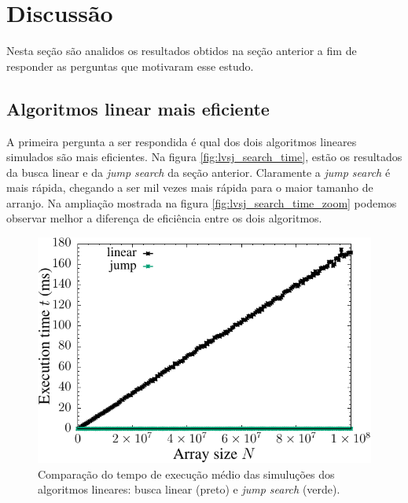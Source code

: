 \chapter{Discussão}

Nesta seção são analidos os resultados obtidos na seção anterior a fim de responder as perguntas que motivaram esse estudo.

\section{Algoritmos linear mais eficiente}

A primeira pergunta a ser respondida é qual dos dois algoritmos lineares simulados são mais eficientes. Na figura \ref{fig:lvsj_search_time}, estão os resultados da busca linear e da {\it jump search} da seção anterior. Claramente a {\it jump search} é mais rápida, chegando a ser mil vezes mais rápida para o maior tamanho de arranjo. Na ampliação mostrada na figura \ref{fig:lvsj_search_time_zoom} podemos observar melhor a diferença de eficiência entre os dois algoritmos. 

\begin{figure}[H]
  \centering
  \includegraphics[scale=1.2]{../plots/lvsj_search_time.pdf}
 \caption{Comparação do tempo de execução médio das simuluções dos algoritmos lineares: busca linear (preto) e {\it jump search} (verde).}
\end{figure} \label{fig:lvsj_search_time}

